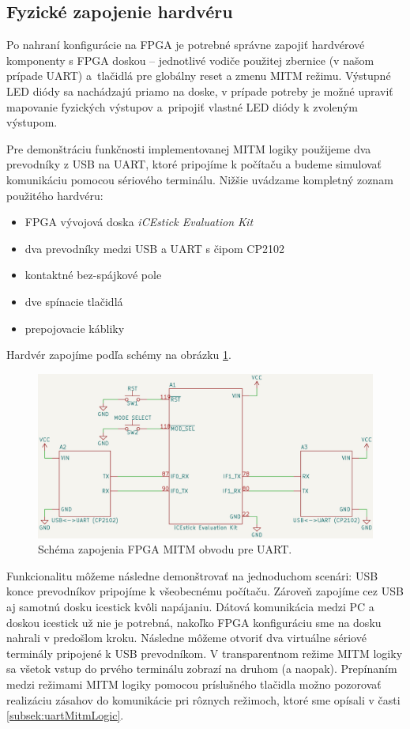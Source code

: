 \subsection{Fyzické zapojenie hardvéru}
Po nahraní konfigurácie na FPGA je potrebné správne zapojiť hardvérové komponenty s FPGA doskou -- jednotlivé vodiče použitej zbernice (v našom prípade UART) a~tlačidlá pre globálny reset a zmenu MITM režimu. Výstupné LED diódy sa nachádzajú priamo na doske, v prípade potreby je možné upraviť mapovanie fyzických výstupov a~pripojiť vlastné LED diódy k zvoleným výstupom.

Pre demonštráciu funkčnosti implementovanej MITM logiky použijeme dva prevodníky z USB na UART, ktoré pripojíme k počítaču a budeme simulovať komunikáciu pomocou sériového terminálu. Nižšie uvádzame kompletný zoznam použitého hardvéru:
\begin{itemize}
    \item FPGA vývojová doska \textit{iCEstick Evaluation Kit}
    \item dva prevodníky medzi USB a UART s čipom CP2102
    \item kontaktné bez-spájkové pole
    \item dve spínacie tlačidlá
    \item prepojovacie kábliky
\end{itemize}
Hardvér zapojíme podľa schémy na obrázku \ref{obr:schemeUartMitm}.

\begin{figure}
    \centerline{\includegraphics[width=1\textwidth]{images/schematics/schemeUartMitm.png}}
    \caption[Schéma zapojenia FPGA MITM obvodu pre UART]{Schéma zapojenia FPGA MITM obvodu pre UART.}
    \label{obr:schemeUartMitm}
\end{figure}

Funkcionalitu môžeme následne demonštrovať na jednoduchom scenári: USB konce prevodníkov pripojíme k všeobecnému počítaču. Zároveň zapojíme cez USB aj samotnú dosku icestick kvôli napájaniu. Dátová komunikácia medzi PC a doskou icestick už nie je potrebná, nakoľko FPGA konfiguráciu sme na dosku nahrali v predošlom kroku. Následne môžeme otvoriť dva virtuálne sériové terminály pripojené k USB prevodníkom. V transparentnom režime MITM logiky sa všetok vstup do prvého terminálu zobrazí na druhom (a naopak). Prepínaním medzi režimami MITM logiky pomocou príslušného tlačidla možno pozorovať realizáciu zásahov do komunikácie pri rôznych režimoch, ktoré sme opísali v časti \ref{subsek:uartMitmLogic}.

